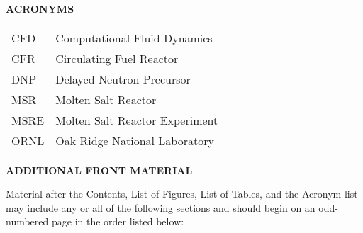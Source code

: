 \documentclass[11pt,letterpaper,twoside,english,final]{article}
\begin{document}
\newpage

\clearemptydoublepage
{} 
\begin{centering}
\listoffigures 
\end{centering}


\newpage

\clearemptydoublepage
{} 
\begin{centering}
\listoftables 
\end{centering}


\newpage

\clearemptydoublepage
{}
{} 
\begin{center}
{\bf{ACRONYMS}}
\end{center}

\begin{table}[h]
\vspace{-6pt}
\begin{tabular}{l l} 
CFD & Computational Fluid Dynamics \\
CFR & Circulating Fuel Reactor \\
DNP & Delayed Neutron Precursor \\
MSR & Molten Salt Reactor \\
MSRE & Molten Salt Reactor Experiment \\
ORNL & Oak Ridge National Laboratory \\
\end{tabular}
\end{table}


\newpage

\clearemptydoublepage
{}
{}
\begin{center}
{\bf{ADDITIONAL FRONT MATERIAL}}
\end{center}

Material after the Contents, List of Figures, List of Tables, and the Acronym list may include any or all of the following sections and should begin on an odd-numbered page in the order listed below:
\end{document}

